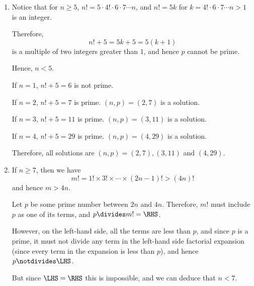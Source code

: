 \Question{\currfilebase}

\begin{enumerate}
    \item Notice that for \(n \geq 5\), \(n! = 5 \cdot 4! \cdot 6 \cdot 7 \cdots n\), and \(n! = 5k\) for \(k = 4! \cdot 6 \cdot 7 \cdots n > 1\) is an integer.

          Therefore,
          \[
              n! + 5 = 5k + 5 = 5 (k + 1)
          \]
          is a multiple of two integers greater than \(1\), and hence \(p\) cannot be prime.

          Hence, \(n < 5\).

          If \(n = 1\), \(n! + 5 = 6\) is not prime.

          If \(n = 2\), \(n! + 5 = 7\) is prime. \((n, p) = (2, 7)\) is a solution.

          If \(n = 3\), \(n! + 5 = 11\) is prime. \((n, p) = (3, 11)\) is a solution.

          If \(n = 4\), \(n! + 5 = 29\) is prime. \((n, p) = (4, 29)\) is a solution.

          Therefore, all solutions are \((n, p) = (2, 7), (3, 11)\) and \((4, 29)\).

    \item If \(n \geq 7\), then we have
          \[
              m! = 1! \times 3! \times \cdots \times (2n - 1)! > (4n)!
          \]
          and hence \(m > 4n\).

          Let \(p\) be some prime number between \(2n\) and \(4n\). Therefore, \(m!\) must include \(p\) as one of its terms, and \(p \divides m! = \RHS\).

          However, on the left-hand side, all the terms are less than \(p\), and since \(p\) is a prime, it must not divide any term in the left-hand side factorial expansion (since every term in the expansion is less than \(p\)), and hence \(p \notdivides \LHS\).

          But since \(\LHS = \RHS\) this is impossible, and we can deduce that \(n < 7\).


\end{enumerate}
